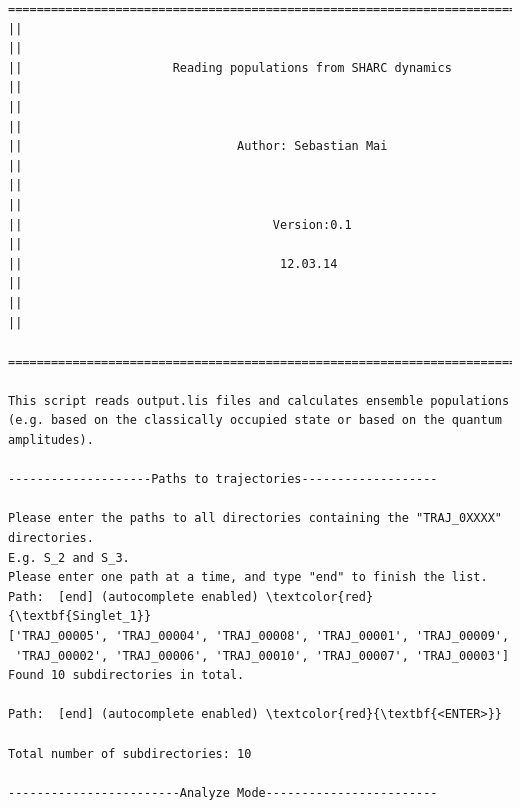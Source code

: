 \documentclass[a4paper,11pt,DIV=15,openany]{scrbook}
\newcommand{\ttt}[1]{\texttt{#1}}
\begin{document}
% 
% 
\begin{oframed}
\footnotesize\begin{Verbatim}[commandchars=\\\{\}]
  ================================================================================  
||                                                                                ||
||                     Reading populations from SHARC dynamics                    ||
||                                                                                ||
||                              Author: Sebastian Mai                             ||
||                                                                                ||
||                                   Version:0.1                                  ||
||                                    12.03.14                                    ||
||                                                                                ||
  ================================================================================  

This script reads output.lis files and calculates ensemble populations 
(e.g. based on the classically occupied state or based on the quantum amplitudes).
  
--------------------Paths to trajectories-------------------

Please enter the paths to all directories containing the "TRAJ_0XXXX" directories.
E.g. S_2 and S_3. 
Please enter one path at a time, and type "end" to finish the list.
Path:  [end] (autocomplete enabled) \textcolor{red}{\textbf{Singlet_1}}
['TRAJ_00005', 'TRAJ_00004', 'TRAJ_00008', 'TRAJ_00001', 'TRAJ_00009', 
 'TRAJ_00002', 'TRAJ_00006', 'TRAJ_00010', 'TRAJ_00007', 'TRAJ_00003']
Found 10 subdirectories in total.

Path:  [end] (autocomplete enabled) \textcolor{red}{\textbf{<ENTER>}}

Total number of subdirectories: 10

------------------------Analyze Mode------------------------


\end{Verbatim}
\end{oframed}
\end{document}
